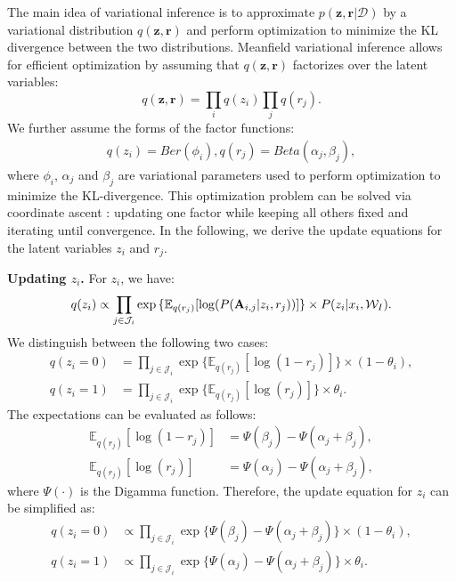 The main idea of variational inference \cite{tzikas2008variational} is to approximate $p(\mathbf{z},\mathbf{r} | \mathcal{D})$ by a variational distribution $q(\mathbf{z},\mathbf{r})$ and perform optimization to minimize the KL divergence between the two distributions. Meanfield variational inference allows for efficient optimization by assuming that $q(\mathbf{z},\mathbf{r})$ factorizes over the latent variables:
\begin{equation}
    q(\mathbf{z},\mathbf{r})=\prod_{i} q(z_i) \prod_j q(r_j).
    \label{eq:dist_fact}
\end{equation}
%
We further assume the forms of the factor functions:
\begin{align}
    q(z_i)=Ber(\phi_i), q(r_j)=Beta(\alpha_j,\beta_j),
\end{align}
%
where $\phi_i$, $\alpha_j$ and $\beta_j$ are variational parameters used to perform optimization to minimize the KL-divergence. This optimization problem can be solved via coordinate ascent \cite{blei2017variational}: updating one factor while keeping all others fixed and iterating until convergence. In the following, we derive the update equations for the latent variables $z_i$ and $r_j$.

\smallskip
\noindent\textbf{Updating $z_i$.} For $z_i$, we have:
%
\begin{equation}
q(z_i)    \propto \prod_{j \in \mathcal{J}_{i}} \exp{\{\mathbb{E}_{q(r_j)}[\log (P(\mathbf{A}_{i,j}|z_i,r_j))]\}}   \times P(z_i|x_i, \mathcal{W}_I). \\
\end{equation}
%
We distinguish between the following two cases:
%
\begin{align}
  q(z_i=0)   &= \prod_{j \in \mathcal{J}_{i}} \exp{\{\mathbb{E}_{q(r_j)}[\log (1-r_j)]\}}\times (1-\theta_i) \nonumber, \\
  q(z_i=1)   &= \prod_{j \in \mathcal{J}_{i}} \exp{\{\mathbb{E}_{q(r_j)}[\log (r_j)]\}}\times \theta_i .
\label{eq:q_two_poss}                
\end{align}
%
The expectations can be evaluated as follows:
\begin{align}
    \mathbb{E}_{q(r_j)}[\log (1-r_j)]&= \Psi(\beta_j)-\Psi(\alpha_j+\beta_j), \nonumber \\
    \mathbb{E}_{q(r_j)}[\log (r_j)]&= \Psi(\alpha_j)-\Psi(\alpha_j+\beta_j),
    \label{eq:expect}
\end{align}
where $\Psi(\cdot)$ is the Digamma function. Therefore, the update equation for $z_i$ can be simplified as:
\begin{align}
    q(z_i=0)   &\propto \prod_{j \in \mathcal{J}_{i}} \exp{\{\Psi(\beta_j)-\Psi(\alpha_j+\beta_j)\}}\times (1-\theta_i), \nonumber \\  
     q(z_i=1)    &\propto \prod_{j \in \mathcal{J}_{i}} \exp{\{ \Psi(\alpha_j)-\Psi(\alpha_j+\beta_j)\}}\times \theta_i  .
     \label{eq:qzi}
\end{align}


